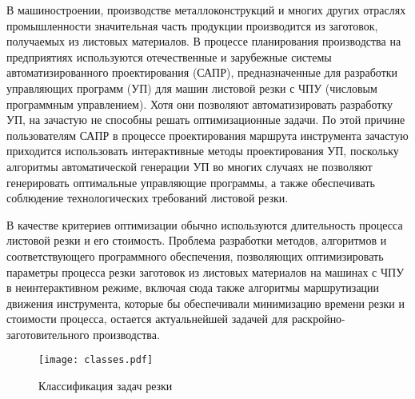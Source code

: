 
В машиностроении, производстве металлоконструкций и
многих других отраслях промышленности значительная часть продукции
производится из заготовок, получаемых из листовых материалов.
В процессе планирования производства
на предприятиях используются отечественные и зарубежные
системы автоматизированного проектирования (САПР),
предназначенные для разработки управляющих программ (УП)
для машин листовой резки с ЧПУ
(числовым программным управлением).
Хотя они позволяют автоматизировать разработку УП,
на зачастую не способны решать оптимизационные задачи.
По этой причине
пользователям САПР
в процессе проектирования маршрута инструмента
зачастую приходится использовать интерактивные методы проектирования
УП,
поскольку алгоритмы автоматической генерации УП
во многих случаях не позволяют генерировать
оптимальные управляющие программы,
а также обеспечивать соблюдение технологических требований листовой резки.

В качестве критериев
оптимизации обычно используются длительность процесса листовой резки и его стоимость.
Проблема разработки методов, алгоритмов
и соответствующего программного обеспечения,
позволяющих оптимизировать параметры процесса резки заготовок
из листовых материалов на машинах с ЧПУ
в неинтерактивном режиме,
включая сюда также алгоритмы маршрутизации движения инструмента,
которые бы обеспечивали минимизацию времени резки и стоимости процесса,
остается актуальнейшей задачей для раскройно-заготовительного производства.

\begin{figure}
  \centering
  \texttt{[image: classes.pdf]}
  \caption{Классификация задач резки}
  \label{fig:cut-classes}
\end{figure}
